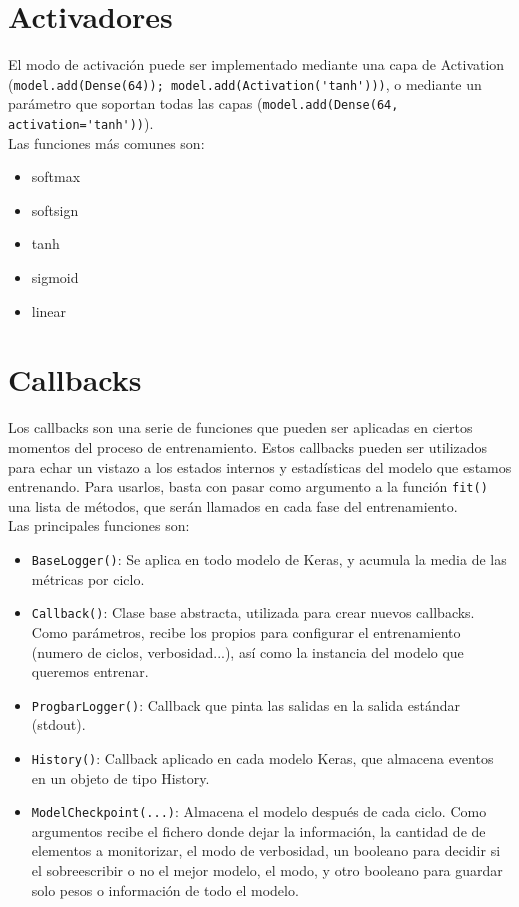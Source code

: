 \section{Activadores}
El modo de activación puede ser implementado mediante una capa de Activation (\lstinline{model.add(Dense(64)); model.add(Activation('tanh')))}, o mediante un parámetro que soportan todas las capas (\lstinline{model.add(Dense(64, activation='tanh'))}).\\
Las funciones más comunes son:
\begin{itemize}[noitemsep]
\item softmax
\item softsign
\item tanh
\item sigmoid
\item linear
\end{itemize}
\section{Callbacks}
Los callbacks son una serie de funciones que pueden ser aplicadas en ciertos momentos del proceso de entrenamiento. Estos callbacks pueden ser utilizados para echar un vistazo a los estados internos y estadísticas del modelo que estamos entrenando. Para usarlos, basta con pasar como argumento a la función \lstinline{fit()} una lista de métodos, que serán llamados en cada fase del entrenamiento.\\
Las principales funciones son:
\begin{itemize}
\item \lstinline{BaseLogger()}: Se aplica en todo modelo de Keras, y acumula la media de las métricas por ciclo.
\item \lstinline{Callback()}: Clase base abstracta, utilizada para crear nuevos callbacks. Como parámetros, recibe los propios para configurar el entrenamiento (numero de ciclos, verbosidad...), así como la instancia del modelo que queremos entrenar.
\item \lstinline{ProgbarLogger()}: Callback que pinta las salidas en la salida estándar (stdout).
\item \lstinline{History()}: Callback aplicado en cada modelo Keras, que almacena eventos en un objeto de tipo History.
\item \lstinline{ModelCheckpoint(...)}: Almacena el modelo después de cada ciclo. Como argumentos recibe el fichero donde dejar la información, la cantidad de de elementos a monitorizar, el modo de verbosidad, un booleano para decidir si el sobreescribir o no el mejor modelo, el modo, y otro booleano para guardar solo pesos o información de todo el modelo.
\end{itemize}
